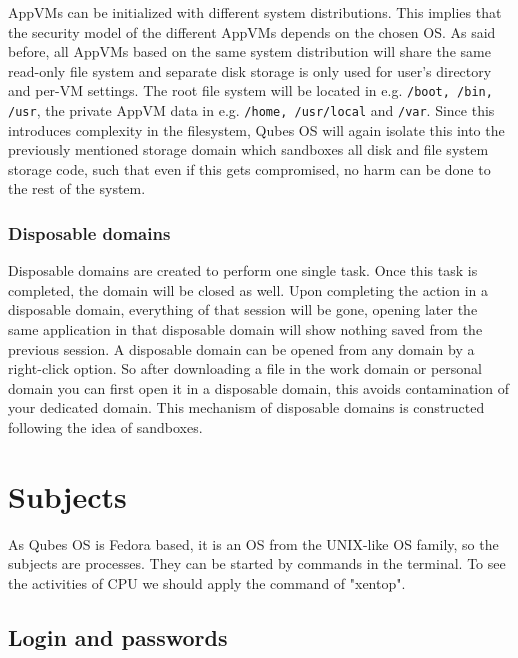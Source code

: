 \documentclass[runningheads,a4paper]{article}
\begin{document}
AppVMs can be initialized with different system
distributions. This implies that the security model of the different 
AppVMs depends on the chosen OS. As said before, all AppVMs
based on the same system distribution will share the same read-only
file system and separate disk storage is only used for user's
directory and per-VM settings. The root file system will be located in
e.g. \texttt{/boot, /bin, /usr}, the private AppVM data in
e.g. \texttt{/home, /usr/local} and \texttt{/var}. 
Since this introduces complexity in the
filesystem, Qubes OS will again isolate this into the previously
mentioned storage domain which sandboxes
all disk and file system storage code, such that even if this gets
compromised, no harm can be done to the rest of the system.

\subsubsection{Disposable domains}

Disposable domains are created to perform one single task. Once this
task is completed, the domain will be closed as well. Upon completing
the action in a disposable domain, everything of that session will be
gone, opening later the same application in that disposable domain
will show nothing saved from the previous session. A disposable domain
can be opened from any domain by a right-click option. So after
downloading a file in the work domain or personal domain you can first
open it in a disposable domain, this avoids contamination of your
dedicated domain. This mechanism of disposable domains is constructed
following the idea of sandboxes.


\section{Subjects}

As Qubes OS is Fedora based, it is an OS from the UNIX-like OS family,
so the
subjects are processes. They can be started by commands in the
terminal. To see the activities of CPU we should apply the command of
"xentop". 

\subsection{Login and passwords} 
\end{document}
